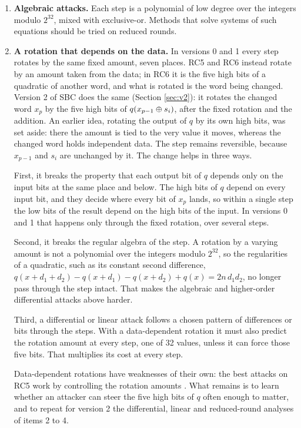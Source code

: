 \begin{enumerate}
\item \textbf{Algebraic attacks.} Each step is a polynomial of low degree over
      the integers modulo $2^{32}$, mixed with exclusive-or. Methods that
      solve systems of such equations should be tried on reduced rounds.

\item \label{item:rotation}\textbf{A rotation that depends on the data.} In
      versions 0 and 1 every step rotates by the same fixed amount, seven
      places. RC5 \cite{rivest1995} and RC6 \cite{RRSY98} instead rotate by
      an amount taken from the data; in RC6 it is the five high bits of a
      quadratic of another word, and what is rotated is the word being
      changed. Version 2 of SBC does the same (Section \ref{sec:v2}): it
      rotates the changed word $x_p$ by the five high bits of
      $q(x_{p-1} \oplus s_i)$, after the fixed rotation and the addition. An
      earlier idea, rotating the output of $q$ by its own high bits, was set
      aside: there the amount is tied to the very value it moves, whereas the
      changed word holds independent data. The step remains reversible,
      because $x_{p-1}$ and $s_i$ are unchanged by it. The change helps in
      three ways.

      First, it breaks the property that each output bit of $q$ depends
      only on the input bits at the same place and below. The high bits of
      $q$ depend on every input bit, and they decide where every bit of $x_p$
      lands, so within a single step the low bits of the result depend
      on the high bits of the input. In versions 0 and 1 that happens only
      through the fixed rotation, over several steps.

      Second, it breaks the regular algebra of the step. A rotation by a
      varying amount is not a polynomial over the integers modulo $2^{32}$,
      so the regularities of a quadratic, such as its constant second
      difference, $q(x+d_1+d_2) - q(x+d_1) - q(x+d_2) + q(x) = 2n\,d_1 d_2$,
      no longer pass through the step intact. That makes the algebraic and
      higher-order differential attacks above harder.

      Third, a differential or linear attack follows a chosen pattern of
      differences or bits through the steps. With a data-dependent rotation
      it must also predict the rotation amount at every step, one of 32
      values, unless it can force those five bits. That multiplies its cost
      at every step.

      Data-dependent rotations have weaknesses of their own: the best attacks
      on RC5 work by controlling the rotation amounts \cite{biryukov1998}. What
      remains is to learn whether an attacker can steer the five high bits of
      $q$ often enough to matter, and to repeat for version 2 the differential,
      linear and reduced-round analyses of items 2 to 4.


\end{enumerate}
